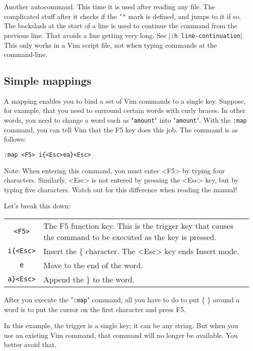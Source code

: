 Another autocommand.
This time it is used after reading any file.
The complicated stuff after it checks if the \texttt{'"} mark is defined, and jumps to it if so.
The backslash at the start of a line is used to continue the command from the previous line.
That avoids a line getting very long.
See |\texttt{:h line-continuation}|.
This only works in a Vim script file, not when typing commands at the command-line.

\subsection{Simple mappings}
\label{Simple mappings}
A mapping enables you to bind a set of Vim commands to a single key.
Suppose, for example, that you need to surround certain words with curly braces.
In other words, you need to change a word such as "\texttt{amount}" into "{\texttt{amount}}".
With the \texttt{:map} command, you can tell Vim that the F5 key does this job.
The command is as follows:

 \begin{Verbatim}[samepage=true]
 :map <F5> i{<Esc>ea}<Esc>
 \end{Verbatim}

Note: When entering this command, you must enter <F5> by typing four characters.
Similarly, <Esc> is not entered by pressing the <Esc> key, but by typing five characters.
Watch out for this difference when reading the manual!

Let's break this down:
\begin{longtable}{c l}
				\texttt{<F5>} & The F5 function key.
				This is the trigger key that causes the command to be executed as the key is pressed.\\

				\texttt{i\{<Esc>} & Insert the \{ character.
				The <Esc> key ends Insert mode.\\

				\texttt{e} & Move to the end of the word.\\

				\texttt{a\}<Esc>} & Append the \} to the word.\\
\end{longtable}

After you execute the "\texttt{:map}" command, all you have to do to put \{ \} around a word is to put the cursor on the first character and press F5.

In this example, the trigger is a single key; it can be any string.
But when you use an existing Vim command, that command will no longer be available.
You better avoid that.

